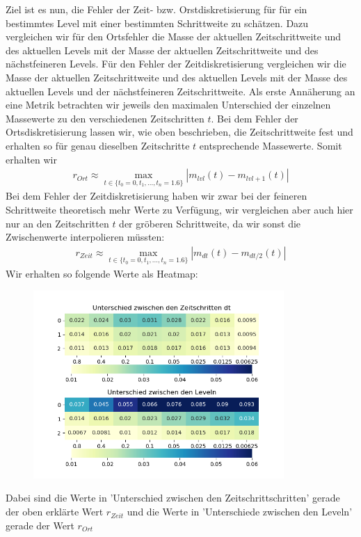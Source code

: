 Ziel ist es nun, die Fehler der Zeit- bzw. Orstdiskretisierung für für ein bestimmtes Level mit einer bestimmten Schrittweite zu schätzen. 
Dazu vergleichen wir für den Ortsfehler die Masse der aktuellen Zeitschrittweite und des aktuellen Levels mit der Masse der aktuellen Zeitschrittweite und des nächstfeineren Levels.
Für den Fehler der Zeitdiskretisierung vergleichen wir die Masse der aktuellen Zeitschrittweite und des aktuellen Levels mit der Masse des aktuellen Levels und der nächstfeineren Zeitschrittweite.
Als erste Annäherung an eine Metrik betrachten wir jeweils den maximalen Unterschied der einzelnen Massewerte zu den verschiedenen Zeitschritten $t$.
Bei dem Fehler der Ortsdiskretisierung lassen wir, wie oben beschrieben, die Zeitschrittweite fest und erhalten so für genau dieselben Zeitschritte $t$ entsprechende Massewerte. Somit erhalten wir 
\begin{align*}
	r_{Ort}  \approx \max_{t \in \{t_0 = 0,t_1,...,t_n=1.6 \}  } |m_{lvl}(t) - m_{lvl + 1} (t) |
\end{align*}
Bei dem Fehler der Zeitdiskretisierung haben wir zwar bei der feineren Schrittweite theoretisch mehr Werte zu Verfügung, wir vergleichen aber auch hier nur an den Zeitschritten $t$ der gröberen Schrittweite, da wir sonst die Zwischenwerte interpolieren müssten:
\begin{align*}
r_{Zeit}  \approx \max_{t \in \{t_0 = 0,t_1,...,t_n=1.6 \}  } |m_{dt}(t) - m_{dt/2} (t) |
\end{align*}
Wir erhalten so folgende Werte als Heatmap:
\begin{figure}[H]
	\centering
	\includegraphics[width=0.85\textwidth]{../Aufgabe31/Maxdiff/Heatmapblub.png}
\end{figure}
Dabei sind die Werte in 'Unterschied zwischen den Zeitschrittschritten' gerade der oben erklärte Wert $r_{Zeit}$ und die Werte in  'Unterschiede zwischen den Leveln' gerade der Wert $r_{Ort}$

